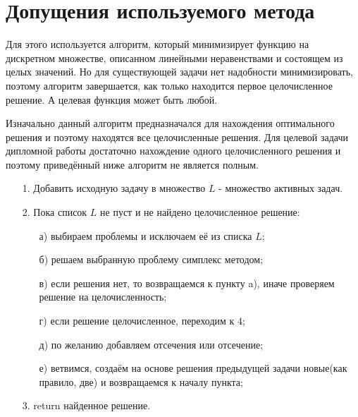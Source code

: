 \documentclass[a4paper,14pt,russian]{extreport}
\begin{document}
\section{Допущения используемого метода}
Для этого используется алгоритм, который минимизирует функцию на дискретном множестве, описанном линейными неравенствами и состоящем из целых значений. Но для существующей задачи нет надобности минимизировать, поэтому алгоритм завершается, как только находится первое целочисленное решение. А целевая функция может быть любой. 
\par
Изначально данный алгоритм предназначался для нахождения оптимального решения и поэтому находятся все целочисленные решения. Для целевой задачи дипломной работы достаточно нахождение одного целочисленного решения и поэтому приведённый ниже алгоритм не является полным. 
\par

\begin{enumerate}
\item[1.]
Добавить исходную задачу в множество $L$ - множество активных задач.
\item[2.]
Пока список $L$ не пуст и не найдено целочисленное решение:
\begin{enumerate}
\item[а)] выбираем проблемы и исключаем её из списка $L$;
\item[б)] решаем выбранную проблему симплекс методом;
\item[в)] если решения нет, то возвращаемся к пункту a), иначе проверяем решение на целочисленность;
\item[г)] если решение целочисленное, переходим к 4;
\item[д)] по желанию добавляем отсечения или отсечение;
\item[е)] ветвимся, создаём на основе решения предыдущей задачи новые(как правило, две) и возвращаемся к началу пункта;
\end{enumerate}
\item[3.] return найденное решение.
\end{enumerate}
\end{document}
